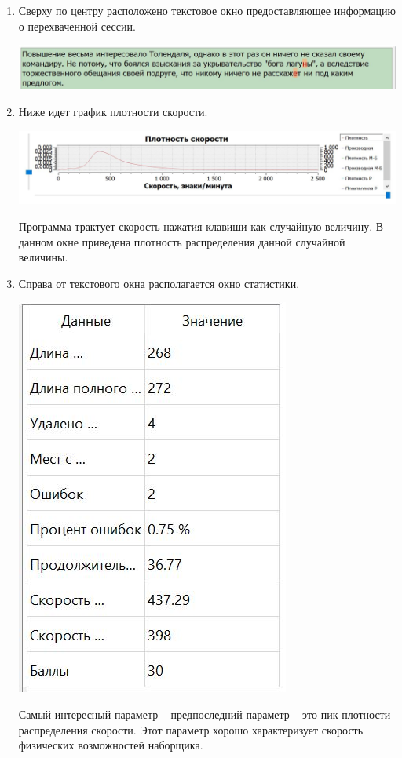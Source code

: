 \begin{enumerate}
\item
\label{item::TextView}
Сверху по центру расположено текстовое окно предоставляющее информацию о перехваченной сессии.
\begin{center}
\includegraphics[scale=0.5]{Figures/TextView.JPG}
\end{center}

\item Ниже идет график плотности скорости.
\begin{center}
\includegraphics[scale=0.5]{Figures/plotView.JPG}
\end{center} 
Программа трактует скорость нажатия клавиши как случайную величину.
В данном окне приведена плотность распределения данной случайной величины.

\item Справа от текстового окна располагается окно статистики.
\begin{center}
\includegraphics[scale=0.5]{Figures/StatView.JPG}
\end{center}
Самый интересный параметр -- предпоследний параметр -- это пик плотности распределения скорости.
Этот параметр хорошо характеризует скорость физических возможностей наборщика.


\end{enumerate}
